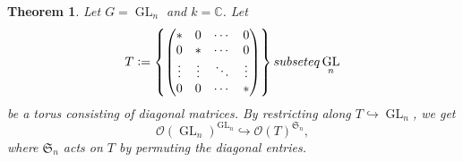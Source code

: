 \documentclass[10pt]{article}
\newtheorem{theorem}{Theorem} [section]
\numberwithin{equation}{theorem}
\DeclareMathOperator{\GL}{GL}
\newcommand{\defeq}{\vcentcolon=}
\newcommand{\Ouv}[0]{\mathcal{O}}
\newcommand{\C}[0]{\mathbb{C}}
\begin{document}
\begin{theorem}
  \label{theorem_restriction_along_torus}
  Let $G=\GL_n$ and $k=\C$. Let 
  \begin{equation*}
    T \defeq \left\{\begin{pmatrix}
      \ast & 0 & \cdots & 0\\
      0 & \ast & \cdots & 0\\
      \vdots & \vdots & \ddots & \vdots\\
      0 & 0 & \cdots & \ast
    \end{pmatrix}
    \right\}
    subseteq \GL_n
  \end{equation*}
  be a torus consisting of diagonal matrices. By restricting along $T\hookrightarrow \GL_n$, we get 
  \begin{equation*}
    \Ouv(\GL_n)^{\GL_n}\hookrightarrow \Ouv(T)^{\mathfrak{S}_n},
  \end{equation*}
where $\mathfrak{S}_n$ acts on $T$ by permuting the diagonal entries.
\end{theorem}
\end{document}
